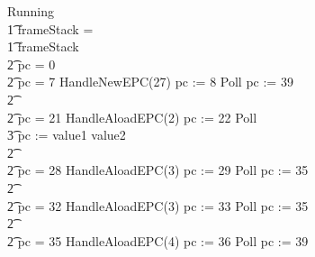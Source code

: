 \begin{figure}
  \begin{center}
    \begin{multicols}{4}
      \columnbreak
      \scriptsize
      \setlength{\zedindent}{0cm}
      \begin{circus}
        Running \circdef \\
        \t1 \circif frameStack = \emptyset \circthen \Skip \\
        \t1 {} \circelse frameStack \neq \emptyset \circthen {} \\
        \t2 \circif pc = 0 \circthen {} \cdots {} \\
        \t2 {} \circelse pc = 7 \circthen HandleNewEPC(27) \circseq pc := 8 \circseq Poll \circseq \cdots \circseq pc := 39 \\
        \t2 {} \cdots {} \\
        \t2 {} \circelse pc = 21 \circthen HandleAloadEPC(2) \circseq pc := 22 \circseq Poll \circseq \cdots \circseq \\
        \t3 pc := \IF value1 \leq value2   \\
        \t2 {} \cdots {} \\
        \t2 {} \circelse pc = 28 \circthen HandleAloadEPC(3) \circseq pc := 29 \circseq Poll \circseq \cdots \circseq pc := 35 \\
        \t2 {} \cdots {} \\
        \t2 {} \circelse pc = 32 \circthen HandleAloadEPC(3) \circseq pc := 33 \circseq Poll \circseq \cdots \circseq pc := 35 \\
        \t2 {} \cdots {} \\
        \t2 {} \circelse pc = 35 \circthen HandleAloadEPC(4) \circseq pc := 36 \circseq Poll \circseq \cdots \circseq pc := 39 \\

\end{circus}
\end{multicols}
\end{center}
\end{figure}
